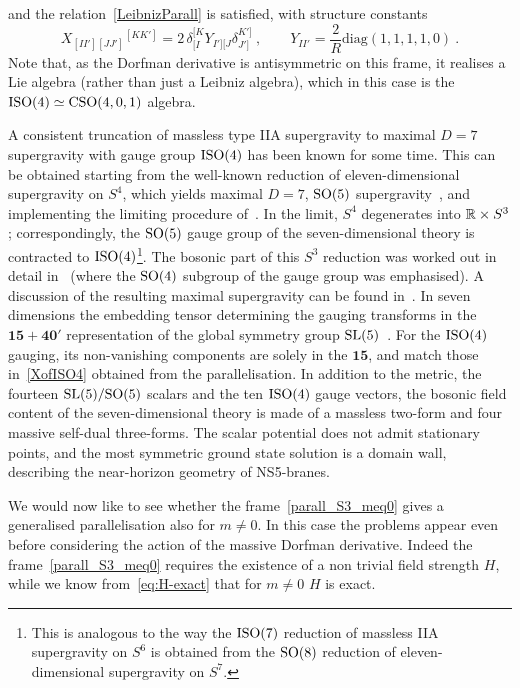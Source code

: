 \documentclass[debug]{phd}
\begin{document}
				and the relation~\eqref{LeibnizParall} is satisfied, with structure constants
						\begin{equation}\label{XofISO4}
							X_{[II'][JJ']}{}^{[KK']} = 2\, \delta_{[I}^{[K}Y_{I'][J}\delta_{J']}^{K']}\ , \qquad Y_{II'} = \frac{2}{R} \mathrm{diag}(1,1,1,1,0)\ .
							\end{equation}
				Note that, as the Dorfman derivative is antisymmetric on this frame, it realises a Lie algebra (rather than just a Leibniz algebra), which in this case is the $\mathrm{ISO}(4)\simeq\mathrm{CSO}(4,0,1)$ algebra. 

				A consistent truncation of massless type IIA supergravity to maximal $D=7$ supergravity with gauge group $\mathrm{ISO}(4)$ has been known for some time. 
				This can be obtained starting from the well-known reduction of eleven-dimensional supergravity on $S^4$, which yields maximal $D=7$, $\mathrm{SO}(5)$ supergravity~\cite{Nastase:1999kf}, and implementing the limiting procedure of~\cite{Hull:1988jw}. 
				In the limit, $S^4$ degenerates into $\mathbb{R} \times S^3$; correspondingly, the $\mathrm{SO}(5)$ gauge group of the seven-dimensional theory is contracted to $\mathrm{ISO}(4)$\footnote{%
					This is analogous to the way the $\mathrm{ISO}(7)$ reduction of massless IIA supergravity on $S^6$ is obtained from the $\mathrm{SO}(8)$ reduction of eleven-dimensional supergravity on $S^7$.}.
				The bosonic part of this $S^3$ reduction was worked out in detail in~\cite{Cvetic:2000ah} (where the $\mathrm{SO}(4)$ subgroup of the gauge group was emphasised). 
				A discussion of the resulting maximal supergravity can be found in~\cite{Samtleben:2005bp}. 
				In seven dimensions the embedding tensor determining the gauging transforms in the $\mathbf{15} + \mathbf{40'}$ representation of the global symmetry group $\mathrm{SL}(5)$~\cite{Samtleben:2005bp}. 
				For the $\mathrm{ISO}(4)$ gauging, its non-vanishing components are solely in the $\mathbf{15}$, and match those in~\eqref{XofISO4} obtained from the parallelisation. 
				In addition to the metric, the fourteen $\mathrm{SL}(5)/\mathrm{SO}(5)$ scalars and the ten $\mathrm{ISO}(4)$ gauge vectors, the bosonic field content of the seven-dimensional theory is made of a massless two-form and four massive self-dual three-forms.
				The scalar potential does not admit stationary points, and the most symmetric ground state solution is a domain wall, describing the near-horizon geometry of NS5-branes.

				We would now like to see whether the frame~\eqref{parall_S3_meq0} gives a generalised parallelisation also for $m\neq0$. 
				In this case the problems appear even before considering the action of the massive Dorfman derivative. 
				Indeed the frame~\eqref{parall_S3_meq0} requires the existence of a non trivial field strength $H$, while we know from~\eqref{eq:H-exact} that for $m\neq 0$ $H$ is exact. 
\end{document}
